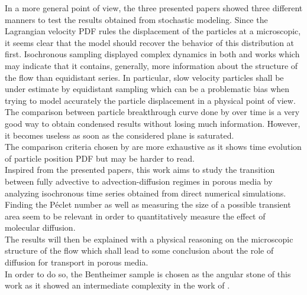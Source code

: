 In a more general point of view, the three presented papers showed three different manners to test the results obtained from stochastic modeling. 
Since the Lagrangian velocity PDF rules the displacement of the particles at a microscopic, it seems clear that the model should recover the behavior of this distribution at first.
Isochronous sampling displayed complex dynamics in both \citet{Meyer2016} and \citet{Puyguiraud2019} works which may indicate that it contains, generally, more information about the structure of the flow than equidistant series.
In particular, slow velocity particles shall be under estimate by equidistant sampling which can be a problematic bias when trying to model accurately the particle displacement in a physical point of view.\\
The comparison between particle breakthrough curve done by \citet{Dentz2017} over time is a very good way to obtain condensed results without losing much information. However, it becomes useless as soon as the considered plane is saturated.\\
The comparison criteria chosen by \citet{Meyer2016} are more exhaustive as it shows time evolution of particle position PDF but may be harder to read.\\

Inspired from the presented papers, this work aims to study the transition between fully advective to advection-diffusion regimes in porous media by analyzing isochronous time series obtained from direct numerical simulations. 
Finding the Péclet number as well as measuring the size of a possible transient area seem to be relevant in order to quantitatively measure the effect of molecular diffusion.\\
The results will then be explained with a physical reasoning on the microscopic structure of the flow which shall lead to some conclusion about the role of diffusion for transport in porous media.\\
In order to do so, the Bentheimer sample is chosen as the angular stone of this work as it showed an intermediate complexity in the work of \citet{Meyer2016}.
